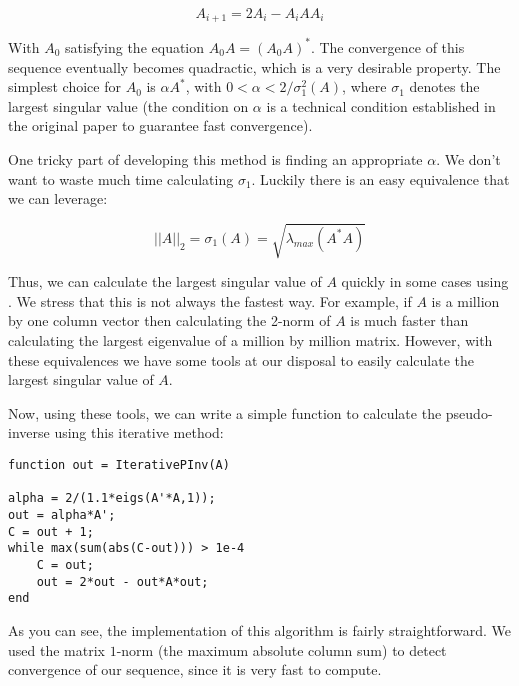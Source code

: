 \[
A_{i+1} = 2A_i - A_i A A_i
\]

With $A_0$ satisfying the equation $A_0 A = (A_0 A)^*$. The convergence of this sequence eventually becomes quadractic, which is a very desirable property. The simplest choice for $A_0$ is $\alpha A^*$, with $0 < \alpha < 2/\sigma_1^2(A)$, where $\sigma_1$ denotes the largest singular value (the condition on $\alpha$ is a technical condition established in the original paper to guarantee fast convergence).

One tricky part of developing this method is finding an appropriate $\alpha$. We don't want to waste much time calculating $\sigma_1$. Luckily there is an easy equivalence that we can leverage:

\[
||A||_2 = \sigma_1(A) = \sqrt{\lambda_{max} (A^* A)}
\]

Thus, we can calculate the largest singular value of $A$ quickly in some cases using . We stress that this is not always the fastest way. For example, if $A$ is a million by one column vector then calculating the 2-norm of $A$ is much faster than calculating the largest eigenvalue of a million by million matrix. However, with these equivalences we have some tools at our disposal to easily calculate the largest singular value of $A$.

Now, using these tools, we can write a simple function to calculate the pseudo-inverse using this iterative method:

\begin{lstlisting}
function out = IterativePInv(A)

alpha = 2/(1.1*eigs(A'*A,1));
out = alpha*A';
C = out + 1;
while max(sum(abs(C-out))) > 1e-4
    C = out;
    out = 2*out - out*A*out;
end
\end{lstlisting}

As you can see, the implementation of this algorithm is fairly straightforward. We used the matrix $1$-norm (the maximum absolute column sum) to detect convergence of our sequence, since it is very fast to compute.

